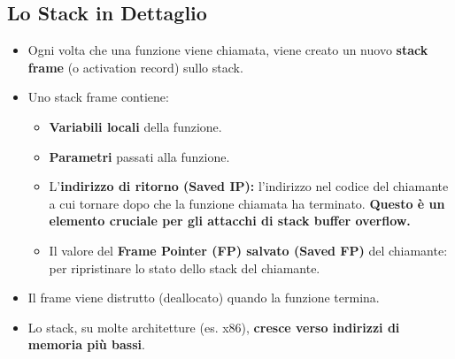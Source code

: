 \documentclass{article}
\begin{document}
\subsection{Lo Stack in Dettaglio}
\begin{itemize}
    \item Ogni volta che una funzione viene chiamata, viene creato un nuovo \textbf{stack frame} (o activation record) sullo stack.
    \item Uno stack frame contiene:
        \begin{itemize}
            \item \textbf{Variabili locali} della funzione.
            \item \textbf{Parametri} passati alla funzione.
            \item L'\textbf{indirizzo di ritorno (Saved IP):} l'indirizzo nel codice del chiamante a cui tornare dopo che la funzione chiamata ha terminato. \textbf{Questo è un elemento cruciale per gli attacchi di stack buffer overflow.}
            \item Il valore del \textbf{Frame Pointer (FP) salvato (Saved FP)} del chiamante: per ripristinare lo stato dello stack del chiamante.
        \end{itemize}
    \item Il frame viene distrutto (deallocato) quando la funzione termina.
    \item Lo stack, su molte architetture (es. x86), \textbf{cresce verso indirizzi di memoria più bassi}.
\end{itemize}
\end{document}
